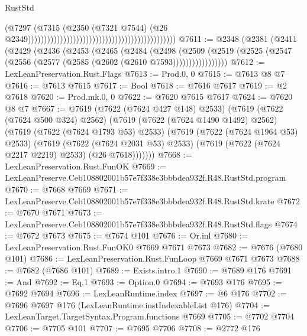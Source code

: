 \begin{lexlean}{RustStd}
\begin{coremodule}
                                                                                        (@7297
                                                                                          (@7315
                                                                                            (@2350
                                                                                              (@7321
                                                                                                @7544)
                                                                                              (@26
                                                                                                @2349))))))))))))))))))))))))))))))))))))))))))))))
@7611 := @2348
    (@2381
      (@2411
        (@2429
          (@2436
            (@2453
              (@2465
                (@2484
                  (@2498
                    (@2509
                      (@2519 (@2525 (@2547 (@2556 (@2577 (@2585 (@2602 (@2610 @7593)))))))))))))))))
@7612 := LexLeanPreservation.Rust.Flags
@7613 := Prod.{0, 0}
@7615 := @7613 @8 @7
@7616 := @7613 @7615
@7617 := Bool
@7618 := @7616 @7617
@7619 := @2 @7618
@7620 := Prod.mk.{0, 0}
@7622 := @7620 @7615 @7617
@7624 := @7620 @8 @7
@7667 := @7619
    (@7622 (@7624 @427 @148) @2533)
    (@7619
      (@7622 (@7624 @500 @324) @2562)
      (@7619
        (@7622 (@7624 @1490 @1492) @2562)
        (@7619
          (@7622 (@7624 @1793 @53) @2533)
          (@7619
            (@7622 (@7624 @1964 @53) @2533)
            (@7619
              (@7622 (@7624 @2031 @53) @2533)
              (@7619 (@7622 (@7624 @2217 @2219) @2533) (@26 @7618)))))))
@7668 := LexLeanPreservation.Rust.FunOK
@7669 := LexLeanPreserve.Ceb108802001b57e7f338e3bbbdea932f.R48.RustStd.program
@7670 := @7668 @7669
@7671 := LexLeanPreserve.Ceb108802001b57e7f338e3bbbdea932f.R48.RustStd.krate
@7672 := @7670 @7671
@7673 := LexLeanPreserve.Ceb108802001b57e7f338e3bbbdea932f.R48.RustStd.flags
@7674 := @7672 @7673
@7675 := @7674 @101
@7676 := Or.inl
@7680 := LexLeanPreservation.Rust.FunOK0 @7669 @7671 @7673
@7682 := @7676 (@7680 @101)
@7686 := LexLeanPreservation.Rust.FunLoop @7669 @7671 @7673
@7688 := @7682 (@7686 @101)
@7689 := Exists.intro.{1}
@7690 := @7689 @176
@7691 := And
@7692 := Eq.{1}
@7693 := Option.{0}
@7694 := @7693 @176
@7695 := @7692 @7694
@7696 := LexLeanRuntime.index
@7697 := @6 @176
@7702 := @7696 @7697 @176 (LexLeanRuntime.instIndexableList @176)
@7704 := LexLeanTarget.TargetSyntax.Program.functions @7669
@7705 := @7702 @7704
@7706 := @7705 @101
@7707 := @7695 @7706
@7708 := @2772 @176

\end{coremodule}
\end{lexlean}
